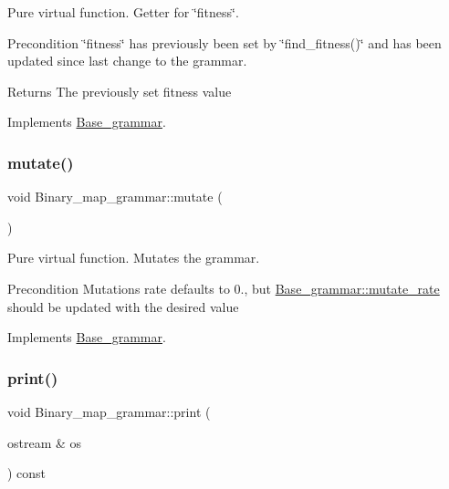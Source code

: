 Pure virtual function. Getter for \char`\"{}fitness\char`\"{}. 

\begin{DoxyPrecond}{Precondition}
\char`\"{}fitness\char`\"{} has previously been set by \char`\"{}find\+\_\+fitness()\char`\"{} and has been updated since last change to the grammar. 
\end{DoxyPrecond}
\begin{DoxyReturn}{Returns}
The previously set fitness value 
\end{DoxyReturn}


Implements \mbox{\hyperlink{classBase__grammar_a8fb451c59454f03cfc0fb4a676894a39}{Base\+\_\+grammar}}.

\mbox{\label{classBinary__map__grammar_aa4c18786cf06a366de319c521767b7ce}} 
\subsubsection{\texorpdfstring{mutate()}{mutate()}}
{\footnotesize\ttfamily void Binary\+\_\+map\+\_\+grammar\+::mutate (\begin{DoxyParamCaption}{ }\end{DoxyParamCaption})\hspace{0.3cm}{\ttfamily [virtual]}}



Pure virtual function. Mutates the grammar. 

\begin{DoxyPrecond}{Precondition}
Mutations rate defaults to 0., but \mbox{\hyperlink{classBase__grammar_aebe2216bc0bfd1139d63e5e3dec3c8e8}{Base\+\_\+grammar\+::mutate\+\_\+rate}} should be updated with the desired value 
\end{DoxyPrecond}


Implements \mbox{\hyperlink{classBase__grammar_a0149287d3e0be2f7fd3657f1c30ac62d}{Base\+\_\+grammar}}.

\mbox{\label{classBinary__map__grammar_a2c96df3dd0ae512c4de573e1e1cd63e5}} 
\subsubsection{\texorpdfstring{print()}{print()}}
{\footnotesize\ttfamily void Binary\+\_\+map\+\_\+grammar\+::print (\begin{DoxyParamCaption}\item[{ostream \&}]{os }\end{DoxyParamCaption}) const\hspace{0.3cm}{\ttfamily [virtual]}}



